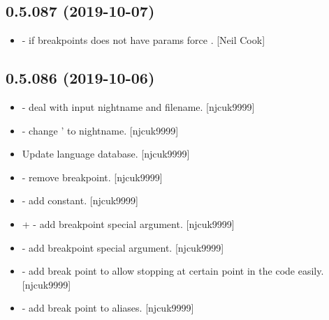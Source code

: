 \documentclass[a4paper,10pt,english]{report}
\begin{document}
\subsection{0.5.087 (2019-10-07)}
\label{\detokenize{misc/changelog:id55}}\begin{itemize}
\item {} 
 - if breakpoints does not have
params force . {[}Neil Cook{]}

\end{itemize}


\subsection{0.5.086 (2019-10-06)}
\label{\detokenize{misc/changelog:id56}}\begin{itemize}
\item {} 
 - deal with input nightname and
filename. {[}njcuk9999{]}

\item {} 
 - change ’ to nightname. {[}njcuk9999{]}

\item {} 
Update language database. {[}njcuk9999{]}

\item {} 
 - remove breakpoint. {[}njcuk9999{]}

\item {} 
 - add 
constant. {[}njcuk9999{]}

\item {} 
 +  - add breakpoint special
argument. {[}njcuk9999{]}

\item {} 
 - add breakpoint special argument.
{[}njcuk9999{]}

\item {} 
 - add break point to allow
stopping at certain point in the code easily. {[}njcuk9999{]}

\item {} 
 - add break point to aliases. {[}njcuk9999{]}

\end{itemize}
\end{document}
